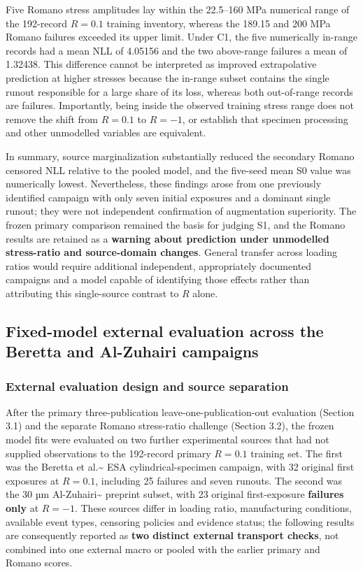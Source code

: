 \documentclass[12pt,a4paper]{article}
\begin{document}
Five Romano stress amplitudes lay within the 22.5–160 MPa numerical range of the 192-record \(R=0.1\) training inventory, whereas the 189.15 and 200 MPa Romano failures exceeded its upper limit. Under C1, the five numerically in-range records had a mean NLL of 4.05156 and the two above-range failures a mean of 1.32438. This difference cannot be interpreted as improved extrapolative prediction at higher stresses because the in-range subset contains the single runout responsible for a large share of its loss, whereas both out-of-range records are failures. Importantly, being inside the observed training stress range does not remove the shift from \(R=0.1\) to \(R=-1\), or establish that specimen processing and other unmodelled variables are equivalent.

In summary, source marginalization substantially reduced the secondary Romano censored NLL relative to the pooled model, and the five-seed mean S0 value was numerically lowest. Nevertheless, these findings arose from one previously identified campaign with only seven initial exposures and a dominant single runout; they were not independent confirmation of augmentation superiority. The frozen primary comparison remained the basis for judging S1, and the Romano results are retained as a \textbf{warning about prediction under unmodelled stress-ratio and source-domain changes}. General transfer across loading ratios would require additional independent, appropriately documented campaigns and a model capable of identifying those effects rather than attributing this single-source contrast to \(R\) alone.

\subsection{Fixed-model external evaluation across the Beretta and Al-Zuhairi campaigns}

\subsubsection{External evaluation design and source separation}

After the primary three-publication leave-one-publication-out evaluation (Section 3.1) and the separate Romano stress-ratio challenge (Section 3.2), the frozen model fits were evaluated on two further experimental sources that had not supplied observations to the 192-record primary \(R=0.1\) training set. The first was the Beretta et al.\textasciitilde{}\cite{beretta2022} ESA cylindrical-specimen campaign, with 32 original first exposures at \(R=0.1\), including 25 failures and seven runouts. The second was the 30 µm Al-Zuhairi\textasciitilde{}\cite{alzuhairi2026} preprint subset, with 23 original first-exposure \textbf{failures only} at \(R=-1\). These sources differ in loading ratio, manufacturing conditions, available event types, censoring policies and evidence status; the following results are consequently reported as \textbf{two distinct external transport checks}, not combined into one external macro or pooled with the earlier primary and Romano scores.
\end{document}
